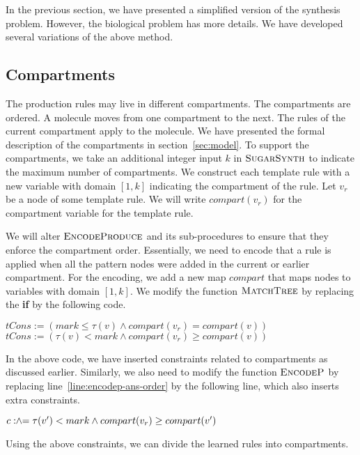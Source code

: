 In the previous section, we have presented a simplified version of
the synthesis problem.
However, the biological problem has more details.
We have developed %
several variations of the
above method.

\subsection{Compartments}

The production rules may live in different compartments.
The compartments are ordered.
A molecule moves from one compartment to the next.
The rules of the current compartment apply to the molecule.
We have presented the formal description of the compartments in
section~\ref{sec:model}.
To support the compartments, we take an additional integer
input $k$ in $\textsc{SugarSynth}$ to indicate the maximum number
of compartments.
We construct each template rule with a new variable with domain $[1,k]$
indicating the compartment of the rule.
Let $v_r$ be a node of some template rule. We will write $compart(v_r)$
for the compartment variable for the template rule.

We will alter $\textsc{EncodeProduce}$ and its sub-procedures to
ensure that they enforce the compartment order.
Essentially, we need to encode that a rule is applied when all the
pattern nodes were added in the current or earlier compartment.
For the encoding, we add a new map $compart$ that maps
nodes to variables with domain $[1,k]$.
We modify the function $\textsc{MatchTree}$ by replacing
the {\bf if} by the following code.
\begin{algorithmic}[1]
  \vspace{1ex}
   \State $tCons := ( mark \leq \tau(v)  \land compart(v_r) = compart(v) )$
  \Else
   \State $tCons := ( \tau(v) < mark  \land compart(v_r) \geq compart(v) )$
   \EndIf
   \vspace{1ex}
\end{algorithmic}
In the above code, we have inserted constraints related to compartments
as discussed earlier.
Similarly, we also need to modify the function
$\textsc{EncodeP}$ by replacing line~\ref{line:encodep-ans-order}
by the following line, which also inserts extra constraints.
\begin{algorithmic}[1]
  \vspace{1ex}
  \State $c \mathrel{:\hspace{-3pt}\land\hspace{-3pt}=} \tau(v') < mark \land compart(v_r) \geq compart(v')$
  \vspace{1ex}
\end{algorithmic}
Using the above constraints, we can divide the learned rules
into compartments.

